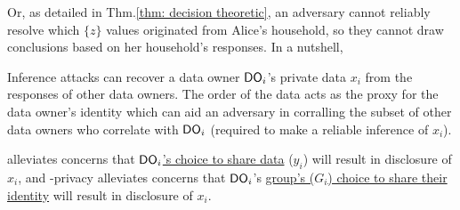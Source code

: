Or, as detailed in Thm.\ref{thm: decision theoretic}, an adversary cannot reliably resolve which $\{z\}$ values originated from Alice's household, so they cannot draw conclusions based on her household's responses. 
In a nutshell,    \vspace{-0.4cm}\squishlistfour   \vspace{-0.3cm}
    \item Inference attacks can recover a data owner $\textsf{DO}_i$'s private data $x_i$ from the responses of other data owners. The order of the data acts as the proxy for the data owner's identity which can aid an adversary in corralling the subset of other data owners who correlate with $\textsf{DO}_i$ (required to make a reliable inference of $x_i$). 
    \item  \DP alleviates concerns that \underline{$\textsf{DO}_i$'s choice to share data} ($y_i$) will result in disclosure of $x_i$, and \name-privacy alleviates concerns that $\textsf{DO}_i$'s \underline{group's ($G_i$) choice to share their identity} will result in disclosure of $x_i$.
    \vspace{-0.2cm}
\squishendfour
   \vspace{-0.3cm}%





